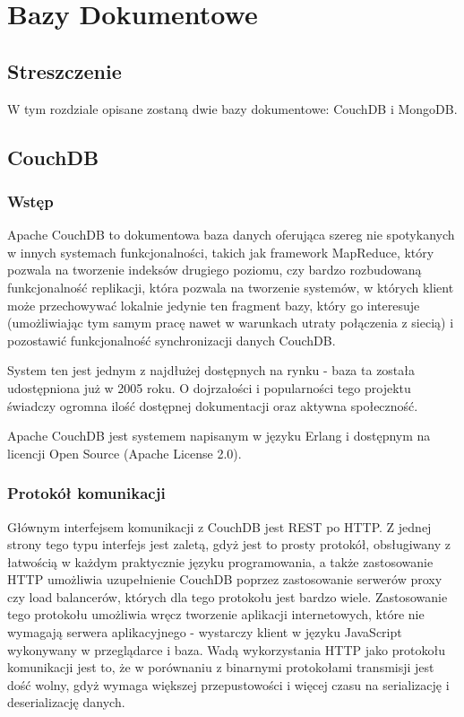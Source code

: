 \chapter{Bazy Dokumentowe}

\section*{Streszczenie}
W tym rozdziale opisane zostaną dwie bazy dokumentowe: CouchDB i MongoDB.

\section{CouchDB}
\label{sec:couchdb}

\subsection*{Wstęp}

Apache CouchDB to dokumentowa baza danych oferująca szereg nie spotykanych w innych systemach funkcjonalności, takich jak framework MapReduce, który pozwala na tworzenie indeksów drugiego poziomu, czy bardzo rozbudowaną funkcjonalność replikacji, która pozwala na tworzenie systemów, w których klient może przechowywać lokalnie jedynie ten fragment bazy, który go interesuje (umożliwiając tym samym pracę nawet w warunkach utraty połączenia z siecią) i pozostawić funkcjonalność synchronizacji danych CouchDB.

System ten jest jednym z najdłużej dostępnych na rynku - baza ta została udostępniona już w 2005 roku.
O dojrzałości i popularności tego projektu świadczy ogromna ilość dostępnej dokumentacji oraz aktywna społeczność.

Apache CouchDB jest systemem napisanym w języku Erlang i dostępnym na licencji Open Source (Apache License 2.0).

\subsection*{Protokół komunikacji}

Głównym interfejsem komunikacji z CouchDB jest REST po HTTP.
Z jednej strony tego typu interfejs jest zaletą, gdyż jest to prosty protokół, obsługiwany z łatwością w każdym praktycznie języku programowania, a także zastosowanie HTTP umożliwia uzupełnienie CouchDB poprzez zastosowanie serwerów proxy czy load balancerów, których dla tego protokołu jest bardzo wiele.
Zastosowanie tego protokołu umożliwia wręcz tworzenie aplikacji internetowych, które nie wymagają serwera aplikacyjnego - wystarczy klient w języku JavaScript wykonywany w przeglądarce i baza.
Wadą wykorzystania HTTP jako protokołu komunikacji jest to, że w porównaniu z binarnymi protokołami transmisji jest dość wolny, gdyż wymaga większej przepustowości i więcej czasu na serializację i deserializację danych.

